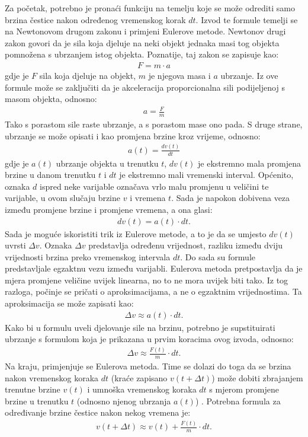 \documentclass{foi}
\begin{document}
 Za početak, potrebno je pronaći funkciju na temelju koje se može odrediti samo brzina čestice nakon određenog vremenskog korak $dt$. Izvod te formule temelji se na Newtonovom drugom zakonu i primjeni Eulerove metode. Newtonov drugi zakon govori da je sila koja djeluje na neki objekt jednaka masi tog objekta pomnožena s ubrzanjem istog objekta. Poznatije, taj zakon se zapisuje kao:
 \begin{align*}
F = m \cdot a
\end{align*}
gdje je $F$ sila koja djeluje na objekt, $m$ je njegova masa i $a$ ubrzanje. Iz ove formule može se zaključiti da je akceleracija proporcionalna sili podijeljenoj s masom objekta, odnosno:
 \begin{align*}
a = \frac{F}{m}
\end{align*}
Tako s porastom sile raste ubrzanje, a s porastom mase ono pada.  S druge strane, ubrzanje se može opisati i kao promjena brzine kroz vrijeme, odnosno:
 \begin{align*}
a(t) = \frac{dv(t)}{dt}
\end{align*}
gdje je $a(t)$ ubrzanje objekta u trenutku $t$, $dv(t)$ je ekstremno mala promjena brzine u danom trenutku $t$ i $dt$ je ekstremno mali vremenski interval. Općenito, oznaka $d$ ispred neke varijable označava vrlo malu promjenu u veličini te varijable, u ovom slučaju brzine $v$ i vremena $t$. Sada je napokon dobivena veza između promjene brzine i promjene vremena, a ona glasi:
 \begin{align*}
dv(t) = a(t) \cdot dt.
\end{align*}
Sada je moguće iskoristiti trik iz Eulerove metode, a to je da se umjesto $dv(t)$ uvrsti $\Delta v$. Oznaka $\Delta v$ predstavlja određenu vrijednost, razliku između dviju vrijednosti brzina preko vremenskog intervala $dt$. Do sada su formule predstavljale egzaktnu vezu između varijabli. Eulerova metoda pretpostavlja da je mjera promjene veličine uvijek linearna, no to ne mora uvijek biti tako. Iz tog razloga, počinje se pričati o aproksimacijama, a ne o egzaktnim vrijednostima. Ta aproksimacija se može zapisati kao:
 \begin{align*}
\Delta v \approx a(t) \cdot dt.
\end{align*}
Kako bi u formulu uveli djelovanje sile na brzinu, potrebno je supstituirati ubrzanje s formulom koja je prikazana u prvim koracima ovog izvoda, odnosno:
 \begin{align*}
\Delta v \approx \frac{F(t)}{m} \cdot dt.
\end{align*}
Na kraju, primjenjuje se Eulerova metoda. Time se dolazi do toga da se brzina nakon vremenskog koraka $dt$ (kraće zapisano $v(t + \Delta t)$) može dobiti zbrajanjem trenutne brzine $v(t)$ i umnoška vremenskog koraka $dt$ s mjerom promjene brzine u trenutku $t$ (odnosno njenog ubrzanja $a(t)$) \parencite{HjorthJensen2021}. Potrebna formula za određivanje brzine čestice nakon nekog vremena je:
 \begin{align*}
v(t + \Delta t) \approx v(t) + \frac{F(t)}{m} \cdot dt.
\end{align*}
\end{document}

